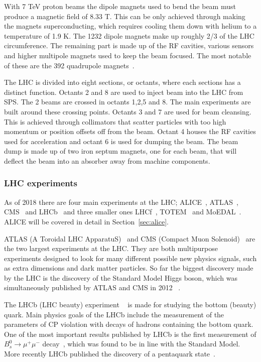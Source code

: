 With 7 TeV proton beams the dipole magnets used to bend the beam must produce a magnetic field of 8.33 T. This can be only achieved through making the magnets superconducting, which requires cooling them down with helium to a temperature of 1.9 K. The 1232 dipole magnets make up roughly 2/3 of the LHC circumference. The remaining part is made up of the RF cavities, various sensors and higher multipole magnets used to keep the beam focused. The most notable of these are the 392 quadrupole magnets~\cite{Bruning:782076}.

The LHC is divided into eight sections, or octants, where each sections has a distinct function. Octants 2 and 8 are used to inject beam into the LHC from SPS. The 2 beams are crossed in octants 1,2,5 and 8. The main experiments are built around these crossing points. Octants 3 and 7 are used for beam cleansing. This is achieved through collimators that scatter particles with too high momentum or position offsets off from the beam. Octant 4 houses the RF cavities used for acceleration and octant 6 is used for dumping the beam. The beam dump is made up of two iron septum magnets, one for each beam, that will deflect the beam into an absorber away from machine components. 


\subsubsection{LHC experiments}
As of 2018 there are four main experiments at the LHC; ALICE~\cite{aliceDetector}, ATLAS~\cite{Aad:2008zzm}, CMS~\cite{Chatrchyan:2008aa} and LHCb~\cite{Alves:2008zz} and three smaller ones LHCf~\cite{Adriani:2008zz}, TOTEM~\cite{Anelli:2008zza} and MoEDAL~\cite{MoEDAL:2016jlb}. ALICE will be covered in detail in Section~\ref{sec:alice}. 

ATLAS (A Toroidal LHC ApparatuS)~\cite{Aad:2008zzm} and CMS (Compact Muon Solenoid)~\cite{Chatrchyan:2008aa} are the two largest experiments at the LHC. They are both multipurpose experiments designed to look for many different possible new physics signals, such as extra dimensions and dark matter particles. So far the biggest discovery made by the LHC is the discovery of the Standard Model Higgs boson, which was simultaneously published by ATLAS and CMS in 2012 ~\cite{Aad:2012tfa, Chatrchyan:2012xdj}.

The LHCb (LHC beauty) experiment ~\cite{Alves:2008zz} is made for studying the bottom (beauty) quark. Main physics goals of the LHCb include the measurement of the parameters of CP violation with decays of hadrons containing the bottom quark. One of the most important results published by LHCb is the first measurement of $B_s^0\rightarrow \mu^+ \mu^-$ decay~\cite{Aaij:2012nna}, which was found to be in line with the Standard Model. More recently LHCb published the discovery of a pentaquark state~\cite{Aaij:2019vzc}.

